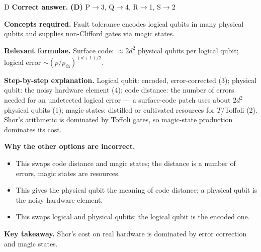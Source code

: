 \documentclass[11pt,a4paper]{article}
\newcommand{\qsep}{\par\vspace{2pt}{\color{black!15}\hrule}\vspace{4pt}}
\begin{document}
\begin{solbox}{D}
\textbf{\color{brand}Correct answer.} \textcolor{okgreen}{\textbf{(D)}} P$\to$3, Q$\to$4, R$\to$1, S$\to$2

\textbf{\color{brand}Concepts required.} Fault tolerance encodes logical qubits in many physical qubits and supplies non-Clifford gates via magic states.

\textbf{\color{brand}Relevant formulae.} Surface code: $\approx2d^2$ physical qubits per logical qubit; logical error $\sim(p/p_{\text{th}})^{(d+1)/2}$.

\textbf{\color{brand}Step-by-step explanation.} Logical qubit: encoded, error-corrected (3); physical qubit: the noisy hardware element (4); code distance: the number of errors needed for an undetected
logical error --- a surface-code patch uses about $2d^2$ physical qubits (1); magic states: distilled or cultivated resources for $T$/Toffoli (2). Shor's
arithmetic is dominated by Toffoli gates, so magic-state production dominates its cost.

\textbf{\color{brand}Why the other options are incorrect.}
\begin{itemize}[leftmargin=2.4em, itemsep=1pt, topsep=2pt]
\item[\textbf{(A)}] This swaps code distance and magic states; the distance is a number of errors, magic states are resources.
\item[\textbf{(B)}] This gives the physical qubit the meaning of code distance; a physical qubit is the noisy hardware element.
\item[\textbf{(C)}] This swaps logical and physical qubits; the logical qubit is the encoded one.
\end{itemize}
\textbf{\color{brand}Key takeaway.} Shor's cost on real hardware is dominated by error correction and magic states.
\end{solbox}
\qsep
\end{document}
